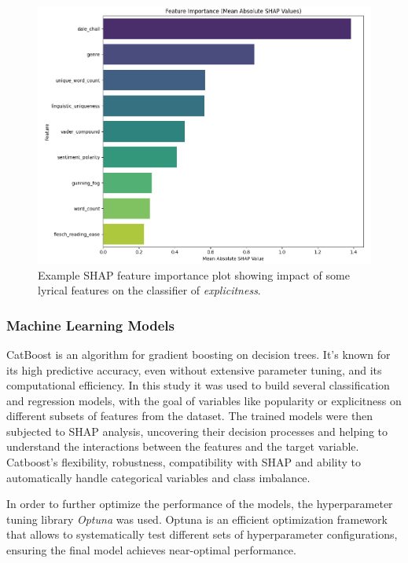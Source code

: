 \begin{center}
\begin{figure}[H]
  \centering
  \includegraphics[width=6in]{img/shap_feature_importance.png}
  \caption{Example SHAP feature importance plot showing impact of some lyrical features
  on the classifier of \textit{explicitness}.}
  \label{Figure:shap_feature_importance}
\end{figure}
\end{center}

\subsubsection*{Machine Learning Models}
CatBoost is an algorithm for gradient boosting on decision trees. It's known
for its high predictive accuracy, even without extensive parameter tuning, and
its computational efficiency. In this study it was used to build several
classification and regression models, with the goal of variables like
popularity or explicitness on different subsets of features from the dataset.
The trained models were then subjected to SHAP analysis, uncovering their
decision processes and helping to understand the interactions between the
features and the target variable. Catboost's flexibility, robustness,
compatibility with SHAP and ability to automatically handle categorical
variables and class imbalance. \cite{catboost}


In order to further optimize the performance of the models, the
hyperparameter tuning library \textit{Optuna} was used. Optuna is an
efficient optimization framework that allows to systematically test different
sets of hyperparameter configurations, ensuring the final model achieves
near-optimal performance. \cite{optuna} 

